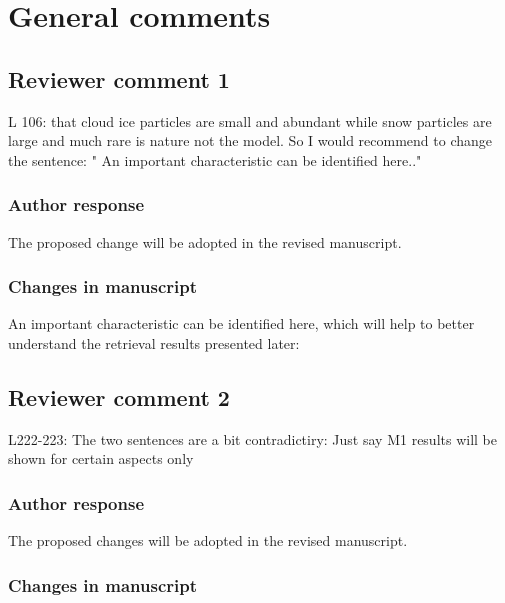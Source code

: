 
\section{General comments}

\subsection*{Reviewer comment 1}

L 106: that cloud ice particles are small and abundant while snow particles are
large and much rare is nature not the model. So I would recommend to change the
sentence: " An important characteristic can be identified here.."

\subsubsection{Author response}

The proposed change will be adopted in the revised manuscript.

\subsubsection*{Changes in manuscript}

  \begin{change}[106]
    An important characteristic \DIFdelbegin {}\DIFdelend
    can be identified here, which will help to better understand the retrieval
    results presented later:
  \end{change}

\subsection*{Reviewer comment 2}

 L222-223: The two sentences are a bit contradictiry: Just say M1 results will be shown for certain aspects only

\subsubsection{Author response}

The proposed changes will be adopted in the revised manuscript.

\subsubsection*{Changes in manuscript}

